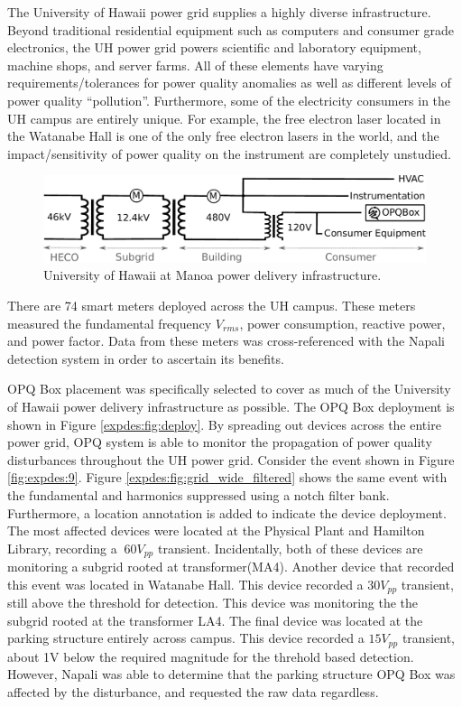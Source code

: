 The University of Hawaii power grid supplies a highly diverse infrastructure.
Beyond traditional residential equipment such as computers and consumer grade electronics, the UH power grid powers scientific and laboratory equipment, machine shops, and server farms.
All of these elements have varying requirements/tolerances for power quality anomalies as well as different levels of power quality ``pollution''.
Furthermore, some of the electricity consumers in the UH campus are entirely unique.
For example, the free electron laser located in the Watanabe Hall is one of the only free electron lasers in the world, and the impact/sensitivity of power quality on the instrument are completely unstudied.
\begin{figure}[ht!]
    \centering
    \includegraphics[width=1\linewidth]{img/uh-grid.pdf}
    \caption{University of Hawaii at Manoa power delivery infrastructure.}
    \label{expdes:fig:1}
\end{figure}

There are 74 smart meters deployed across the UH campus.
These meters measured the fundamental frequency $V_{rms}$, power consumption, reactive power, and power factor.
Data from these meters was cross-referenced with the Napali detection system in order to ascertain its benefits.

OPQ Box placement was specifically selected to cover as much of the University of Hawaii power delivery infrastructure as possible.
The OPQ Box deployment is shown in Figure \ref{expdes:fig:deploy}.
By spreading out devices across the entire power grid, OPQ system is able to monitor the propagation of power quality disturbances throughout the UH power grid.
Consider the event shown in Figure \ref{fig:expdes:9}.
Figure \ref{expdes:fig:grid_wide_filtered} shows the same event with the fundamental and harmonics suppressed using a notch filter bank.
Furthermore, a location annotation is added to indicate the device deployment.
The most affected devices were located at the Physical Plant and Hamilton Library, recording a $~60V_{pp}$ transient.
Incidentally, both of these devices are monitoring a subgrid rooted at transformer(MA4).
Another device that recorded this event was located in Watanabe Hall.
This device recorded a $30V_{pp}$ transient, still above the threshold for detection.
This device was monitoring the the subgrid rooted at the transformer LA4.
The final device was located at the parking structure entirely across campus.
This device recorded a $15V_{pp}$ transient, about 1V below the required magnitude for the threhold based detection.
However, Napali was able to determine that the parking structure OPQ Box was affected by the disturbance, and requested the raw data regardless.

